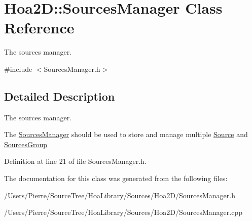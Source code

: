 \hypertarget{class_hoa2_d_1_1_sources_manager}{\section{Hoa2\-D\-:\-:Sources\-Manager Class Reference}
\label{class_hoa2_d_1_1_sources_manager}
}


The sources manager.  




{\ttfamily \#include $<$Sources\-Manager.\-h$>$}



\subsection{Detailed Description}
The sources manager. 

The \hyperlink{class_hoa2_d_1_1_sources_manager}{Sources\-Manager} should be used to store and manage multiple \hyperlink{class_hoa2_d_1_1_source}{Source} and \hyperlink{class_hoa2_d_1_1_sources_group}{Sources\-Group} 

Definition at line 21 of file Sources\-Manager.\-h.



The documentation for this class was generated from the following files\-:\begin{DoxyCompactItemize}
\item 
/\-Users/\-Pierre/\-Source\-Tree/\-Hoa\-Library/\-Sources/\-Hoa2\-D/Sources\-Manager.\-h\item 
/\-Users/\-Pierre/\-Source\-Tree/\-Hoa\-Library/\-Sources/\-Hoa2\-D/Sources\-Manager.\-cpp\end{DoxyCompactItemize}
